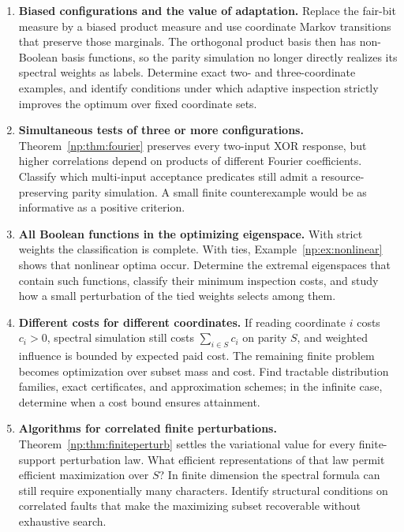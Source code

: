 \documentclass[11pt,a4paper]{article}
\theoremstyle{definition}
\theoremstyle{remark}
\begin{document}
\begin{enumerate}[label=\textbf{Q\arabic*.},ref=Q\arabic*,leftmargin=12mm]
\item\label{np:q:biased} \textbf{Biased configurations and the value of adaptation.}
Replace the fair-bit measure by a biased product measure and use
coordinate Markov transitions that preserve those marginals.
The orthogonal product basis then has non-Boolean basis functions,
so the parity simulation no longer directly realizes its spectral
weights as labels. Determine exact two- and three-coordinate examples,
and identify conditions under which adaptive inspection strictly improves
the optimum over fixed coordinate sets.

\item\label{np:q:multi} \textbf{Simultaneous tests of three or more configurations.}
Theorem~\ref{np:thm:fourier} preserves every two-input XOR response,
but higher correlations depend on products of different Fourier
coefficients. Classify which multi-input acceptance predicates still
admit a resource-preserving parity simulation. A small finite
counterexample would be as informative as a positive criterion.

\item\label{np:q:ties} \textbf{All Boolean functions in the optimizing eigenspace.}
With strict weights the classification is complete. With ties,
Example~\ref{np:ex:nonlinear} shows that nonlinear optima occur.
Determine the extremal eigenspaces that contain such functions,
classify their minimum inspection costs, and study how a small
perturbation of the tied weights selects among them.

\item\label{np:q:costs} \textbf{Different costs for different coordinates.}
If reading coordinate \(i\) costs \(c_i>0\), spectral simulation still
costs \(\sum_{i\in S}c_i\) on parity \(S\), and weighted influence is
bounded by expected paid cost. The remaining finite problem becomes
optimization over subset mass and cost. Find tractable distribution
families, exact certificates, and approximation schemes; in the infinite
case, determine when a cost bound ensures attainment.

\item\label{np:q:correlated} \textbf{Algorithms for correlated finite perturbations.}
Theorem~\ref{np:thm:finiteperturb} settles the variational value for
every finite-support perturbation law. What efficient representations
of that law permit efficient maximization over \(S\)? In finite
dimension the spectral formula can still require exponentially many
characters. Identify structural conditions on correlated faults that
make the maximizing subset recoverable without exhaustive search.


\end{enumerate}
\end{document}
